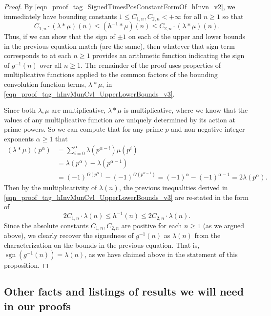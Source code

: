 \documentclass[11pt,reqno,a4letter]{article}
\numberwithin{figure}{section}
\numberwithin{table}{section}
\theoremstyle{plain}
\numberwithin{theorem}{section}
\theoremstyle{definition}
\begin{document}
\begin{proof}
By \eqref{eqn_proof_tag_SignedTimesPosConstantFormOf_hInvn_v2}, we immediately have bounding constants 
$1 \leq C_{1,n}, C_{2,n} < +\infty$ for all $n \geq 1$ so that 
\begin{equation} 
\label{eqn_proof_tag_hInvMunCvl_UpperLowerBounds_v3} 
C_{1,n} \cdot (\lambda \ast \mu)(n) \leq (h^{-1} \ast \mu)(n) \leq C_{2,n} \cdot (\lambda \ast \mu)(n). 
\end{equation} 
Thus, if we can show that the sign of $\pm 1$ on each of the upper and lower bounds in the previous equation 
match (are the same), then whatever that sign term corresponds to at each $n \geq 1$ provides an arithmetic 
function indicating the sign of $g^{-1}(n)$ over all $n \geq 1$. The remainder of the proof uses properties of multiplicative 
functions applied to the common factors of the 
bounding convolution function terms, $\lambda \ast \mu$, in 
\eqref{eqn_proof_tag_hInvMunCvl_UpperLowerBounds_v3}.  

Since both $\lambda,\mu$ are multiplicative, $\lambda \ast \mu$ is multiplicative, where we know that the values of 
any multiplicative function are uniquely determined by its action at prime powers. 
So we can compute that for any prime $p$ and non-negative integer exponents $\alpha \geq 1$ that 
\begin{align*} 
(\lambda \ast \mu)(p^{\alpha}) & = \sum_{i=0}^{\alpha} \lambda(p^{\alpha-i}) \mu(p^{i}) \\ 
     & = \lambda(p^{\alpha}) - \lambda(p^{\alpha-1}) \\ 
     & = 
     (-1)^{\Omega(p^{\alpha})} - (-1)^{\Omega(p^{\alpha-1})} = 
     (-1)^{\alpha} - (-1)^{\alpha-1} = 
     2 \lambda(p^{\alpha}). 
\end{align*} 
Then by the multiplicativity of $\lambda(n)$, the previous inequalities derived in 
\eqref{eqn_proof_tag_hInvMunCvl_UpperLowerBounds_v3} are re-stated in the form of 
\[
2 C_{1,n} \cdot \lambda(n) \leq h^{-1}(n) \leq 2 C_{2,n} \cdot \lambda(n). 
\] 
Since the absolute constants $C_{1,n}, C_{2,n}$ are positive for each $n \geq 1$ (as we argued above), 
we clearly recover the signedness of $g^{-1}(n)$ as $\lambda(n)$ from the characterization on the bounds 
in the previous equation. That is, $\operatorname{sgn}(g^{-1}(n)) = \lambda(n)$, 
as we have claimed above in the statement of this proposition. 
\end{proof} 

\subsection{Other facts and listings of results we will need in our proofs} 
\label{subSection_OtherFactsAndResults} 
\end{document}
